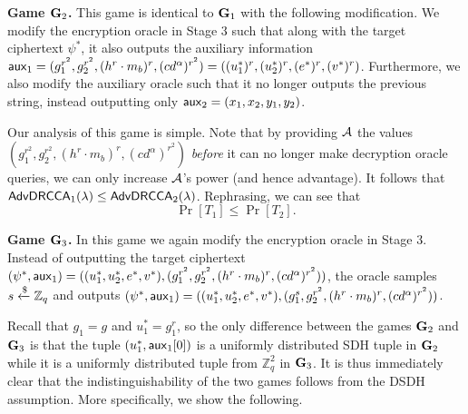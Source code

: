 \textbf{Game $\mathbf{G}_2$.} This game is identical to $\mathbf{G}_1$ with the following modification. We modify the encryption oracle in Stage $3$ such that along with the target ciphertext $\psi^{*}$, it also outputs the auxiliary information $\mathsf{aux}_1 = (g_1^{r^2}, g_2^{r^2},(h^r\cdot m_b)^{r},(cd^{\alpha})^{r^2}) = ((u_1^*)^r, (u_2^*)^r, (e^*)^r, (v^*)^r)$. Furthermore, we also modify the auxiliary oracle such that it no longer outputs the previous string, instead outputting only $\mathsf{aux}_2 = (x_1,x_2,y_1,y_2)$. 

Our analysis of this game is simple. Note that by providing $\mathcal{A}$ the values $(g_1^{r^2}, g_2^{r^2},(h^r\cdot m_b)^{r},(cd^{\alpha})^{r^2})$ \textit{before} it can no longer make decryption oracle queries, we can only increase $\mathcal{A}$'s power (and hence advantage). It follows that $\mathsf{AdvDRCCA}_1(\lambda)\leq\mathsf{AdvDRCCA}_2(\lambda)$. Rephrasing, we can see that $$\Pr[T_1]\leq\Pr[T_2].$$

\textbf{Game $\mathbf{G}_3$.} In this game we again modify the encryption oracle in Stage 3. Instead of outputting the target ciphertext $(\psi^{*}, \mathsf{aux}_1) = ((u_1^{*}, u_2^{*}, e^{*}, v^{*}), (g_1^{r^2}, g_2^{r^2},(h^r\cdot m_b)^{r},(cd^{\alpha})^{r^2}))$, the oracle samples $s \xleftarrow{\$} \mathbb{Z}_{q}$ and outputs $(\psi^{*}, \mathsf{aux}_1) = ((u_1^{*}, u_2^{*}, e^{*}, v^{*}), (g_1^{s}, g_2^{r^2},(h^r\cdot m_b)^{r},(cd^{\alpha})^{r^2}))$. 

Recall that $g_1 = g$ and $u_1^* = g_1^r$, so the only difference between the games $\mathbf{G}_2$ and $\mathbf{G}_3$ is that the tuple $(u_1^*, \mathsf{aux}_1[0])$ is a uniformly distributed SDH tuple in $\mathbf{G}_2$ while it is a uniformly distributed tuple from $\mathbb{Z}_q^2$ in $\mathbf{G}_3$. It is thus immediately clear that the indistinguishability of the two games follows from the DSDH assumption. More specifically, we show the following.

